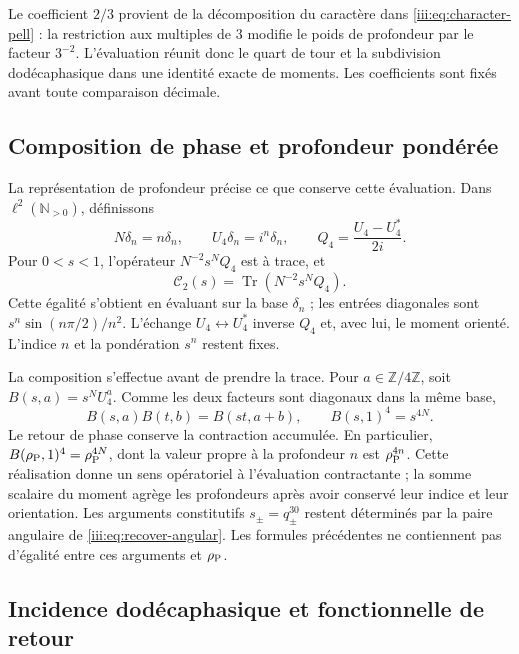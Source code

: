 Le coefficient $2/3$ provient de la décomposition du caractère dans
\eqref{iii:eq:character-pell} : la restriction aux multiples de $3$
modifie le poids de profondeur par le facteur $3^{-2}$. L’évaluation
réunit donc le quart de tour et la subdivision dodécaphasique dans une
identité exacte de moments. Les coefficients sont fixés avant toute
comparaison décimale.

\subsection{Composition de phase et profondeur pondérée}

La représentation de profondeur précise ce que conserve cette évaluation.
Dans $\ell^2(\mathbb N_{>0})$, définissons
\[
 N\delta_n=n\delta_n,\qquad U_4\delta_n=i^n\delta_n,
 \qquad Q_4=\frac{U_4-U_4^*}{2i}.
\]
Pour $0<s<1$, l’opérateur $N^{-2}s^NQ_4$ est à trace, et
\begin{equation}
 \mathcal C_2(s)=\operatorname{Tr}(N^{-2}s^NQ_4).
 \label{iii:eq:pell-depth-trace}
\end{equation}
Cette égalité s’obtient en évaluant sur la base $\delta_n$ ; les
entrées diagonales sont $s^n\sin(n\pi/2)/n^2$. L’échange
$U_4\leftrightarrow U_4^*$ inverse $Q_4$ et, avec lui, le moment
orienté. L’indice $n$ et la pondération $s^n$ restent fixes.

La composition s’effectue avant de prendre la trace. Pour
$a\in\mathbb Z/4\mathbb Z$, soit $B(s,a)=s^NU_4^a$. Comme les deux
facteurs sont diagonaux dans la même base,
\begin{equation}
 B(s,a)B(t,b)=B(st,a+b),\qquad
 B(s,1)^4=s^{4N}.
 \label{iii:eq:pell-depth-composition}
\end{equation}
Le retour de phase conserve la contraction accumulée. En particulier,
$B(\rho_{\rm P},1)^4=\rho_{\rm P}^{4N}$, dont la valeur propre à la profondeur
$n$ est $\rho_{\rm P}^{4n}$. Cette réalisation donne un sens
opératoriel à l’évaluation contractante ; la somme scalaire du moment
agrège les profondeurs après avoir conservé leur indice et leur orientation.
Les arguments constitutifs $s_\pm=q_\pm^{30}$ restent déterminés par
la paire angulaire de \eqref{iii:eq:recover-angular}. Les formules précédentes
ne contiennent pas d’égalité entre ces arguments et $\rho_{\rm P}$.

\subsection{Incidence dodécaphasique et fonctionnelle de retour}

